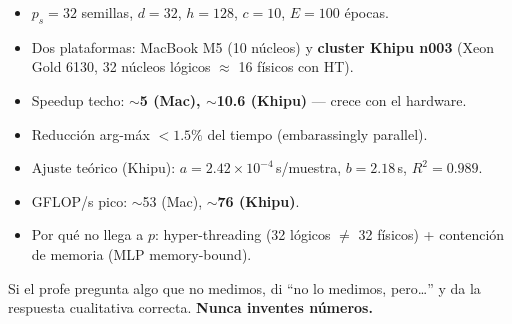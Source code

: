 \documentclass[11pt,a4paper]{article}
\begin{document}
\begin{itemize}
  \item $p_s=32$ semillas, $d=32$, $h=128$, $c=10$, $E=100$ épocas.
  \item Dos plataformas: MacBook M5 (10 núcleos) y \textbf{cluster Khipu n003}
        (Xeon Gold 6130, 32 núcleos lógicos $\approx$ 16 físicos con HT).
  \item Speedup techo: \textbf{$\sim$5 (Mac), $\sim$10.6 (Khipu)} --- crece con
        el hardware.
  \item Reducción arg-máx $<1.5\%$ del tiempo (embarassingly parallel).
  \item Ajuste teórico (Khipu): $a=2.42\!\times\!10^{-4}$\,s/muestra,
        $b=2.18$\,s, $R^2=0.989$.
  \item GFLOP/s pico: $\sim$53 (Mac), \textbf{$\sim$76 (Khipu)}.
  \item Por qué no llega a $p$: hyper-threading (32 lógicos $\neq$ 32 físicos) +
        contención de memoria (MLP memory-bound).
\end{itemize}

\begin{caja}[title=\textbf{Regla de oro}]
Si el profe pregunta algo que no medimos, di ``no lo medimos, pero\ldots'' y da
la respuesta cualitativa correcta. \textbf{Nunca inventes números.}
\end{caja}
\end{document}
